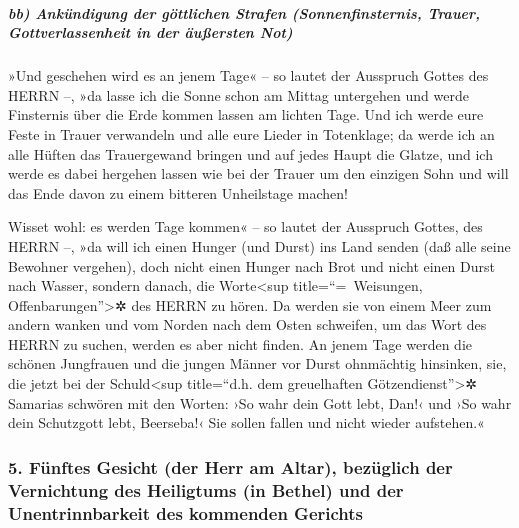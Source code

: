 \hypertarget{bb-ankuxfcndigung-der-guxf6ttlichen-strafen-sonnenfinsternis-trauer-gottverlassenheit-in-der-uxe4uuxdfersten-not}{%
\subparagraph{bb) Ankündigung der göttlichen Strafen (Sonnenfinsternis,
Trauer, Gottverlassenheit in der äußersten
Not)}\label{bb-ankuxfcndigung-der-guxf6ttlichen-strafen-sonnenfinsternis-trauer-gottverlassenheit-in-der-uxe4uuxdfersten-not}}

»Und geschehen wird es an jenem Tage« -- so lautet der
Ausspruch Gottes des HERRN --, »da lasse ich die Sonne schon am Mittag
untergehen und werde Finsternis über die Erde kommen lassen am lichten
Tage. Und ich werde eure Feste in Trauer verwandeln und
alle eure Lieder in Totenklage; da werde ich an alle Hüften das
Trauergewand bringen und auf jedes Haupt die Glatze, und ich werde es
dabei hergehen lassen wie bei der Trauer um den einzigen Sohn und will
das Ende davon zu einem bitteren Unheilstage machen!

Wisset wohl: es werden Tage kommen« -- so lautet der
Ausspruch Gottes, des HERRN --, »da will ich einen Hunger (und Durst)
ins Land senden (daß alle seine Bewohner vergehen), doch nicht einen
Hunger nach Brot und nicht einen Durst nach Wasser, sondern danach, die
Worte\textless sup title=``=~Weisungen, Offenbarungen''\textgreater✲ des
HERRN zu hören. Da werden sie von einem Meer zum andern
wanken und vom Norden nach dem Osten schweifen, um das Wort des HERRN zu
suchen, werden es aber nicht finden. An jenem Tage werden
die schönen Jungfrauen und die jungen Männer vor Durst ohnmächtig
hinsinken, sie, die jetzt bei der Schuld\textless sup
title=``d.h. dem greuelhaften Götzendienst''\textgreater✲ Samarias
schwören mit den Worten: ›So wahr dein Gott lebt, Dan!‹ und ›So wahr
dein Schutzgott lebt, Beerseba!‹ Sie sollen fallen und nicht wieder
aufstehen.«

\hypertarget{fuxfcnftes-gesicht-der-herr-am-altar-bezuxfcglich-der-vernichtung-des-heiligtums-in-bethel-und-der-unentrinnbarkeit-des-kommenden-gerichts}{%
\subsubsection{5. Fünftes Gesicht (der Herr am Altar), bezüglich der
Vernichtung des Heiligtums (in Bethel) und der Unentrinnbarkeit des
kommenden
Gerichts}\label{fuxfcnftes-gesicht-der-herr-am-altar-bezuxfcglich-der-vernichtung-des-heiligtums-in-bethel-und-der-unentrinnbarkeit-des-kommenden-gerichts}}

